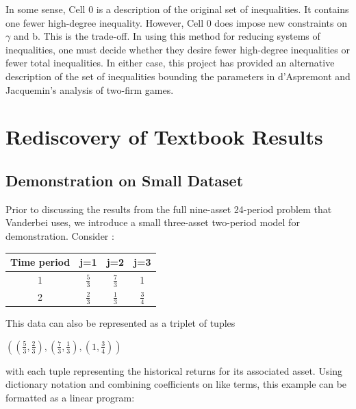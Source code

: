 \documentclass{article}
\begin{document}
In some sense, Cell 0 is a  description of the original set of inequalities. It contains one fewer high-degree inequality. However, Cell 0 does impose new constraints on $\gamma$ and b. This is the trade-off. In using this method for reducing systems of inequalities, one must decide whether they desire fewer high-degree inequalities or fewer total inequalities. In either case, this project has provided an alternative description of the set of inequalities bounding the parameters in d'Aspremont and Jacquemin's analysis of two-firm games.

\section{Rediscovery of Textbook Results}

\subsection{Demonstration on Small Dataset}

Prior to discussing the results from the full nine-asset 24-period problem that Vanderbei uses, we introduce a small three-asset two-period model for demonstration. Consider :


\begin{center} 
\begin{tabular}{ |c|c|c|c| } 
\hline
Time period & j=1 & j=2 & j=3 \\
\hline
1 & $\frac{5}{3}$ & $\frac{7}{3}$ & 1 \\[10pt]
2 & $\frac{2}{3}$ & $\frac{1}{3}$ & $\frac{3}{4}$\\
\hline
\end{tabular}
\end{center}

This data can also be represented as a triplet of tuples

\begin{center}
    $((\frac{5}{3}, \frac{2}{3}), (\frac{7}{3}, \frac{1}{3}), (1,\frac{3}{4}))$
\end{center}

with each tuple representing the historical returns for its associated asset. Using dictionary notation and combining coefficients on like terms, this example can be formatted as a linear program:
\end{document}
